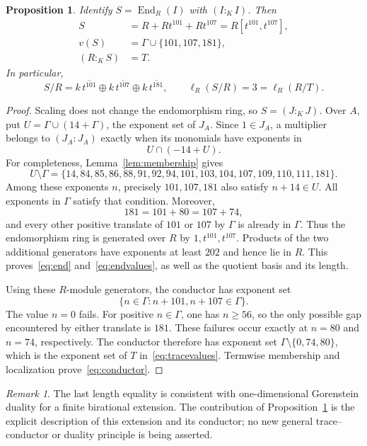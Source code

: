 \documentclass[11pt,letterpaper]{article}
\newtheorem{proposition}[theorem]{Proposition}
\theoremstyle{remark}
\newtheorem{remark}[theorem]{Remark}
\newcommand{\End}{\operatorname{End}}
\newcommand{\length}{\ell}
\numberwithin{equation}{section}
\begin{document}
\begin{proposition}\label{prop:end}
Identify $S=\End_R(I)$ with $(I:_K I)$. Then
\begin{align}
 S&=R+Rt^{101}+Rt^{107}=R[t^{101},t^{107}],\label{eq:end}\\
 v(S)&=\Gamma\cup\{101,107,181\},\label{eq:endvalues}\\
 (R:_K S)&=T.\label{eq:conductor}
\end{align}
In particular,
\[
 S/R=k\,\overline{t^{101}}\oplus k\,\overline{t^{107}}
      \oplus k\,\overline{t^{181}},\qquad
 \length_R(S/R)=3=\length_R(R/T).
\]
\end{proposition}
\begin{proof}
Scaling does not change the endomorphism ring, so $S=(J:_K J)$. Over $A$, put $U=\Gamma\cup(14+\Gamma)$, the exponent set of $J_A$. Since $1\in J_A$, a multiplier belongs to $(J_A:J_A)$ exactly when its monomials have exponents in
\[
 U\cap(-14+U).
\]
For completeness, Lemma~\ref{lem:membership} gives
\[
 U\setminus\Gamma=
 \{14,84,85,86,88,91,92,94,101,103,104,107,109,110,111,181\}.
\]
Among these exponents $n$, precisely $101,107,181$ also satisfy $n+14\in U$. All exponents in $\Gamma$ satisfy that condition. Moreover,
\[
 181=101+80=107+74,
\]
and every other positive translate of $101$ or $107$ by $\Gamma$ is already in $\Gamma$. Thus the endomorphism ring is generated over $R$ by $1,t^{101},t^{107}$. Products of the two additional generators have exponents at least $202$ and hence lie in $R$. This proves~\eqref{eq:end} and~\eqref{eq:endvalues}, as well as the quotient basis and its length.

Using these $R$-module generators, the conductor has exponent set
\[
 \{n\in\Gamma:n+101,n+107\in\Gamma\}.
\]
The value $n=0$ fails. For positive $n\in\Gamma$, one has $n\geq56$, so the only possible gap encountered by either translate is $181$. These failures occur exactly at $n=80$ and $n=74$, respectively. The conductor therefore has exponent set $\Gamma\setminus\{0,74,80\}$, which is the exponent set of $T$ in~\eqref{eq:tracevalues}. Termwise membership and localization prove~\eqref{eq:conductor}.
\end{proof}

\begin{remark}
The last length equality is consistent with one-dimensional Gorenstein duality for a finite birational extension. The contribution of Proposition~\ref{prop:end} is the explicit description of this extension and its conductor; no new general trace--conductor or duality principle is being asserted.
\end{remark}
\end{document}
